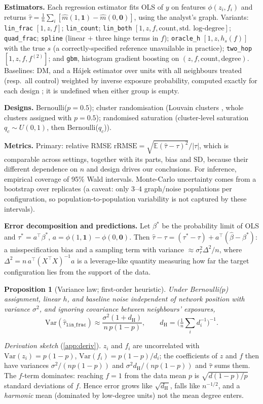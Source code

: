 \documentclass{article}
\theoremstyle{plain}
\newtheorem{proposition}{Proposition}
\theoremstyle{remark}
\newcommand{\E}{\mathbb{E}}
\newcommand{\Var}{\mathrm{Var}}
\newcommand{\dH}{d_{\mathrm H}}
\newcommand{\rrmse}{\mathrm{rRMSE}}
\begin{document}
\textbf{Estimators.} Each regression estimator fits OLS of $y$ on features $\phi(z_i,f_i)$ and returns $\hat\tau=\frac1n\sum_i[\hat m(1,\mathbf 1)-\hat m(0,\mathbf 0)]$, using the analyst's graph. Variants: \texttt{lin\_frac} $[1,z,f]$; \texttt{lin\_count}; \texttt{lin\_both} $[1,z,f,\text{count},\text{std.\ log-degree}]$; \texttt{quad\_frac}; \texttt{spline} (linear $+$ three hinge terms in $f$); \texttt{oracle\_h} $[1,z,h_s(f)]$ with the true $s$ (a correctly-specified reference unavailable in practice); \texttt{two\_hop} $[1,z,f,f^{(2)}]$; and \texttt{gbm}, histogram gradient boosting on $(z,f,\text{count},\text{degree})$. Baselines: DM, and a Hájek estimator over units with all neighbours treated (resp.\ all control) weighted by inverse exposure probability, computed exactly for each design \citep{aronow2017,ugander2013}; it is undefined when either group is empty.

\textbf{Designs.} Bernoulli($p{=}0.5$); cluster randomisation (Louvain clusters \citep{blondel2008}, whole clusters assigned with $p{=}0.5$); randomised saturation (cluster-level saturation $q_c\sim U(0,1)$, then Bernoulli($q_c$)).

\textbf{Metrics.} Primary: relative RMSE $\rrmse=\sqrt{\E(\hat\tau-\tau)^2}/|\tau|$, which is comparable across settings, together with its parts, bias and SD, because their different dependence on $n$ and design drives our conclusions. For inference, empirical coverage of 95\% Wald intervals. Monte-Carlo uncertainty comes from a bootstrap over replicates (a caveat: only 3--4 graph/noise populations per configuration, so population-to-population variability is not captured by these intervals).

\textbf{Error decomposition and predictions.} Let $\beta^\ast$ be the probability limit of OLS and $\tau^\ast=a^\top\beta^\ast$, $a=\phi(1,\mathbf1)-\phi(0,\mathbf0)$. Then $\hat\tau-\tau=(\tau^\ast-\tau)+a^\top(\hat\beta-\beta^\ast)$: a misspecification bias and a sampling term with variance $\approx\sigma_r^2\Delta^2/n$, where $\Delta^2=n\,a^\top(X^\top X)^{-1}a$ is a leverage-like quantity measuring how far the target configuration lies from the support of the data.

\begin{proposition}[Variance law; first-order heuristic]\label{prop:var}
Under Bernoulli($p$) assignment, linear $h$, and baseline noise independent of network position with variance $\sigma^2$, and ignoring covariance between neighbours' exposures,
\[
\Var(\hat\tau_{\mathtt{lin\_frac}})\approx\frac{\sigma^2(1+\dH)}{n\,p(1-p)},\qquad \dH=\Big(\tfrac1n\textstyle\sum_i d_i^{-1}\Big)^{-1}.
\]
\end{proposition}
\emph{Derivation sketch} (\cref{app:deriv}). $z_i$ and $f_i$ are uncorrelated with $\mathrm{Var}(z_i)=p(1-p)$, $\mathrm{Var}(f_i)=p(1-p)/d_i$; the coefficients of $z$ and $f$ then have variances $\sigma^2/(np(1-p))$ and $\sigma^2\dH/(np(1-p))$ and $\hat\tau$ sums them. The $f$-term dominates: reaching $f=1$ from the data mean $p$ is $\sqrt{d(1-p)/p}$ standard deviations of $f$. Hence error grows like $\sqrt{\dH}$, falls like $n^{-1/2}$, and a \emph{harmonic} mean (dominated by low-degree units) not the mean degree enters.
\end{document}
